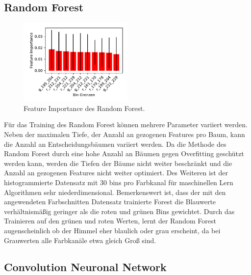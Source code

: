 \subsection{Random Forest}%
\label{sub:random_forest}
\begin{figure}
		\centering
		\vspace{-1.2cm}
		\includegraphics[width=0.5\textwidth]{./pictures/train_rf.pdf}
		\vspace{-1.4cm}
		\caption{Feature Importance des Random Forest.}
		\vspace{-1.4cm}
		\label{fig:}
\end{figure}
Für das Training des Random Forest können mehrere Parameter variiert werden.
Neben der maximalen Tiefe, der Anzahl an gezogenen Features pro Baum, kann die 
Anzahl an Entscheidungsbäumen variiert werden.
Da die Methode des Random Forest durch eine hohe Anzahl an Bäumen gegen 
Overfitting geschützt werden kann, werden die Tiefen der Bäume nicht weiter
beschränkt und die Anzahl an gezogenen Features nicht weiter optimiert.
Des Weiteren ist der histogrammierte Datensatz mit 30 bins pro Farbkanal für
maschinellen Lern Algorithmen sehr niederdimensional.
Bemerkenswert ist, dass der mit den angewendeten Farbschnitten Datensatz trainierte Forest die
Blauwerte verhältnismäßig geringer als die roten und grünen Bins gewichtet.
Durch das Trainieren auf den grünen und roten Werten, lernt der Random Forest
augenscheinlich ob der Himmel eher blaulich oder grau erscheint, da bei
Grauwerten alle Farbkanäle etwa gleich Groß sind.

\subsection{Convolution Neuronal Network}%
\label{sub:convolution_neuronal_network}

